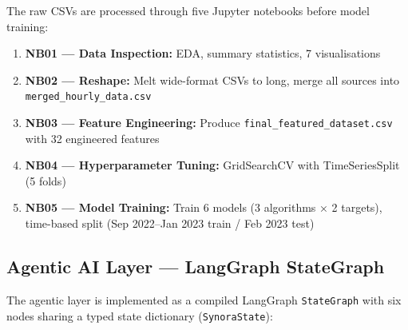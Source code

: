 \documentclass[12pt,a4paper]{article}
\begin{document}
The raw CSVs are processed through five Jupyter notebooks before model training:

\begin{enumerate}
  \item \textbf{NB01 — Data Inspection:} EDA, summary statistics, 7 visualisations
  \item \textbf{NB02 — Reshape:} Melt wide-format CSVs to long, merge all sources into
        \texttt{merged\_hourly\_data.csv}
  \item \textbf{NB03 — Feature Engineering:} Produce \texttt{final\_featured\_dataset.csv}
        with 32 engineered features
  \item \textbf{NB04 — Hyperparameter Tuning:} GridSearchCV with TimeSeriesSplit (5 folds)
  \item \textbf{NB05 — Model Training:} Train 6 models (3 algorithms × 2 targets),
        time-based split (Sep 2022–Jan 2023 train / Feb 2023 test)
\end{enumerate}

\subsection{Agentic AI Layer — LangGraph StateGraph}

The agentic layer is implemented as a compiled LangGraph \texttt{StateGraph} with six
nodes sharing a typed state dictionary (\texttt{SynoraState}):
\end{document}
